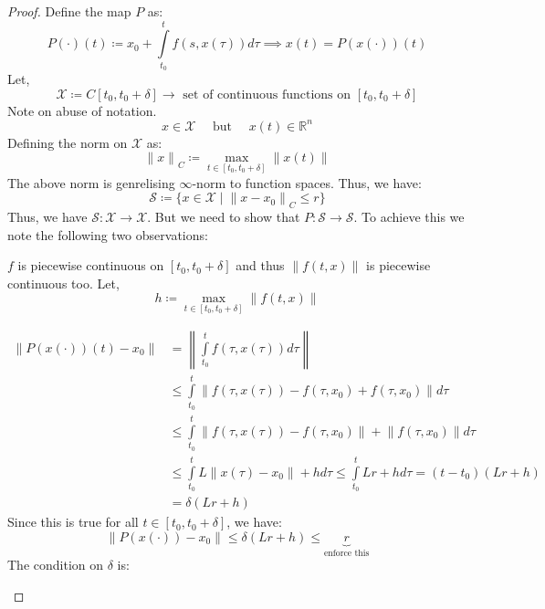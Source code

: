 \begin{proof}
    Define the map \(P\) as:
    \[
        P(\cdot)(t) \coloneqq  x_0 + \int\limits_{t_0}^{t} f(s, x(\tau)) d\tau \implies x(t) = P(x(\cdot))(t)
    \]
    Let,
    \[
        \mathcal{X}  \coloneqq  C[t_0, t_0 + \delta] \to \text{ set of continuous functions on } [t_0, t_0 + \delta] 
    \]
    Note on abuse of notation. 
    \[
        x \in \mathcal{X} \quad \text{ but } \quad x(t) \in \mathbb{R}^n
    \]
    Defining the norm on \(\mathcal{X}\) as:
    \[
        {\lVert x \rVert}_C \coloneqq \max\limits_{t \in [t_0, t_0 + \delta]} \lVert x(t) \rVert  
    \]
    The above norm is genrelising \(\infty \)-norm to function spaces.
    Thus, we have:
    \[
        \mathcal{S} \coloneqq \{x \in \mathcal{X} \mid {\lVert x - x_0 \rVert}_C \leq r\}
    \]
    Thus, we have \(\mathcal{S} : \mathcal{X} \to \mathcal{X}\). But we need to show that 
    \( P : \mathcal{S} \to \mathcal{S}\). To achieve this we note the following two observations:
    \begin{observe}[1]
        \(f\) is piecewise continuous on \([t_0, t_0 + \delta]\) and thus \( \lVert f(t,x) \rVert\) 
        is piecewise continuous too.
        Let,
        \[
            h \coloneqq \max\limits_{t \in [t_0, t_0 + \delta]} \lVert f(t,x) \rVert
        \]
    \end{observe}
    \begin{observe}[2]
        \[
            \begin{aligned}
                \lVert P(x(\cdot))(t) - x_0 \rVert &= \left\lVert \int\limits_{t_0}^{t} f(\tau, x(\tau)) d\tau \right\rVert \\
                &\leq \int\limits_{t_0}^{t} \left\lVert f(\tau , x(\tau)) - f(\tau, x_0) + f(\tau, x_0) \right\rVert d\tau\\
                &\leq \int\limits_{t_0}^{t} \lVert f(\tau, x(\tau)) - f(\tau, x_0) \rVert +
                 \lVert f(\tau, x_0) \rVert d\tau \\
                &\leq \int\limits_{t_0}^{t} L \lVert x(\tau) - x_0 \rVert + h d\tau 
                \leq \int\limits_{t_0}^{t} L r + h d\tau = (t - t_0) (Lr + h) \\&= \delta (Lr + h)
            \end{aligned}
        \]
        Since this is true for all \(t \in [t_0, t_0 + \delta]\), we have:
        \[
            \lVert P(x(\cdot)) - x_0 \rVert \leq \delta (Lr + h) \leq \underbrace{r}_{\text{enforce this}}
        \]
        The condition on \(\delta \) is:
        \[
\]
\end{observe}
\end{proof}
